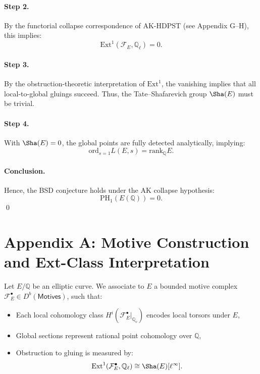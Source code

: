 \paragraph{Step 2.}
By the functorial collapse correspondence of AK-HDPST (see Appendix G–H), this implies:
\[
\mathrm{Ext}^1(\mathcal{F}_E, \mathbb{Q}_\ell) = 0.
\]

\paragraph{Step 3.}
By the obstruction-theoretic interpretation of \( \mathrm{Ext}^1 \), the vanishing implies that all local-to-global gluings succeed.  
Thus, the Tate–Shafarevich group \( \Sha(E) \) must be trivial.

\paragraph{Step 4.}
With \( \Sha(E) = 0 \), the global points are fully detected analytically, implying:
\[
\mathrm{ord}_{s=1}L(E,s) = \mathrm{rank}_\mathbb{Q}E.
\]

\paragraph{Conclusion.}
Hence, the BSD conjecture holds under the AK collapse hypothesis:
\[
\mathrm{PH}_1(E(\mathbb{Q})) = 0.
\]
\qed


\section*{Appendix A: Motive Construction and Ext-Class Interpretation}

Let \( E/\mathbb{Q} \) be an elliptic curve.  
We associate to \( E \) a bounded motive complex \( \mathcal{F}_E^\bullet \in D^b(\mathsf{Motives}) \), such that:

\begin{itemize}
    \item Each local cohomology class \( H^i(\mathcal{F}_E^\bullet|_{\mathbb{Q}_v}) \) encodes local torsors under \( E \),
    \item Global sections represent rational point cohomology over \( \mathbb{Q} \),
    \item Obstruction to gluing is measured by:
    \[
    \mathrm{Ext}^1(\mathcal{F}_E^\bullet, \mathbb{Q}_\ell) \cong \Sha(E)[\ell^\infty].
    \]
\end{itemize}

